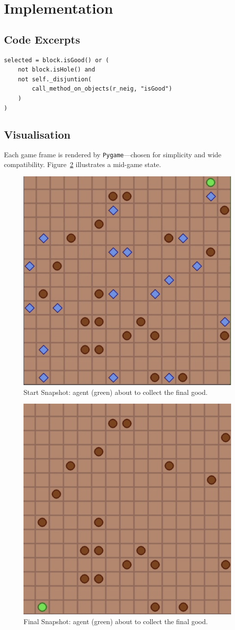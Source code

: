\documentclass[12pt]{article}
\begin{document}
\section{Implementation}\label{sec:implementation}


\subsection{Code Excerpts}
\begin{lstlisting}[caption={Suitability rule in \texttt{agent.py}},label=lst:code]
selected = block.isGood() or (
    not block.isHole() and
    not self._disjuntion(
        call_method_on_objects(r_neig, "isGood")
    )
)
\end{lstlisting}

\subsection{Visualisation}
Each game frame is rendered by \texttt{Pygame}—chosen for simplicity and wide
compatibility.  Figure~\ref{fig:snapshot} illustrates a mid-game state.

\begin{figure}[ht]
    \centering
    \includegraphics[width=.55\linewidth]{start.png}
    \caption{Start Snapshot: agent (green) about to collect the final good.}
    \label{fig:snapshot}
\end{figure}

\begin{figure}[ht]
    \centering
    \includegraphics[width=.55\linewidth]{end.png}
    \caption{Final Snapshot: agent (green) about to collect the final good.}
    \label{fig:snapshot}
\end{figure}
\end{document}
